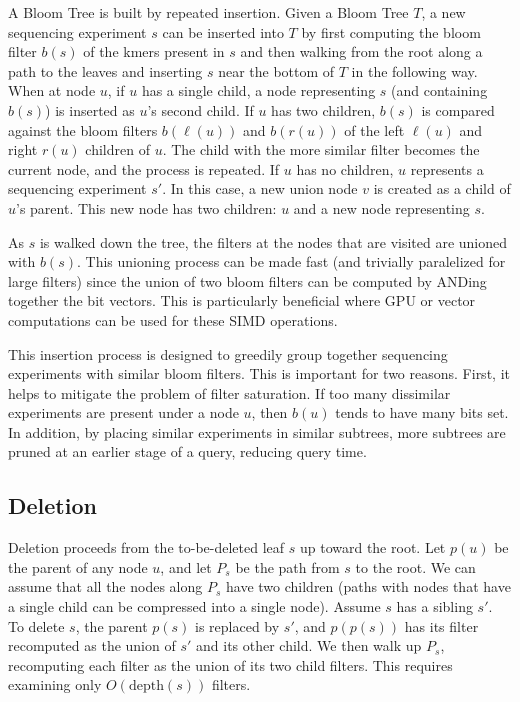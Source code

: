 \documentclass[11pt]{article}
\begin{document}

A Bloom Tree is built by repeated insertion. Given a Bloom Tree $T$, a new sequencing experiment $s$ can be inserted into $T$ by first computing the bloom filter $b(s)$ of the kmers present in $s$ and then walking from the root along a path to the leaves and inserting $s$ near the bottom of $T$ in the following way. When at node $u$, if $u$ has a single child, a node representing $s$ (and containing $b(s)$) is inserted as $u$'s second child. If  $u$ has two children, $b(s)$ is compared against the bloom filters $b(\ell(u))$ and $b(r(u))$ of the left $\ell(u)$ and right $r(u)$ children of $u$. The child with the more similar filter becomes the current node, and the process is repeated.  If $u$ has no children, $u$ represents a sequencing experiment $s'$. In this case, a new union node $v$ is created as a child of $u$'s parent. This new node has two children: $u$ and a new node representing $s$. 

As $s$ is walked down the tree, the filters at the nodes that are visited are unioned with $b(s)$. This unioning process can be made fast (and trivially paralelized for large filters) since the union of two bloom filters can be computed by ANDing together the bit vectors. This is particularly beneficial where GPU or vector computations can be used for these SIMD operations. 

This insertion process is designed to greedily group together sequencing experiments with similar bloom filters. This is important for two reasons. First, it helps to mitigate the problem of filter saturation. If too many dissimilar experiments are present under a node $u$, then $b(u)$ tends to have many bits set. In addition, by placing similar experiments in similar subtrees, more subtrees are pruned at an earlier stage of a query, reducing query time.

\subsection{Deletion}

Deletion proceeds from the to-be-deleted leaf $s$ up toward the root. Let $p(u)$ be the parent of any node $u$, and let $P_s$ be the path from $s$ to the root. We can assume that all the nodes along $P_s$ have two children (paths with nodes that have a single child can be compressed into a single node).  Assume  $s$ has a sibling $s'$. To delete $s$, the parent $p(s)$ is replaced by $s'$, and $p(p(s))$ has its filter recomputed as the union of $s'$ and its other child. We then walk up $P_s$, recomputing each filter as the union of its two child filters. This requires examining only $O(\text{depth}(s))$ filters. 
\end{document}
